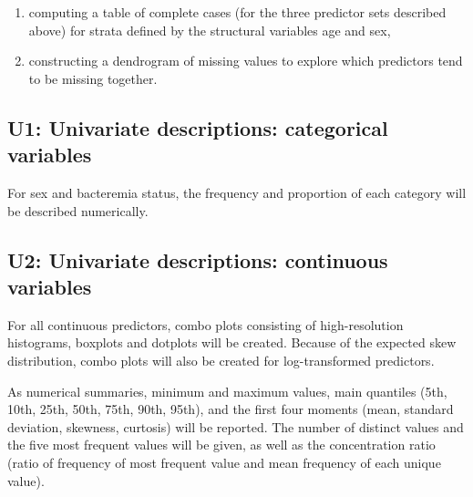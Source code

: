 \documentclass[
  letterpaper,
  DIV=11,
  numbers=noendperiod]{scrreport}
\providecommand{\tightlist}{%
  \setlength{\itemsep}{0pt}\setlength{\parskip}{0pt}}\usepackage{longtable,booktabs,array}
\begin{document}
\begin{enumerate}
\def\labelenumi{\arabic{enumi}.}
\tightlist
\item
  computing a table of complete cases (for the three predictor sets
  described above) for strata defined by the structural variables age
  and sex,
\item
  constructing a dendrogram of missing values to explore which
  predictors tend to be missing together.
\end{enumerate}

\hypertarget{u1-univariate-descriptions-categorical-variables}{%
\subsection{U1: Univariate descriptions: categorical
variables}\label{u1-univariate-descriptions-categorical-variables}}

For sex and bacteremia status, the frequency and proportion of each
category will be described numerically.

\hypertarget{u2-univariate-descriptions-continuous-variables}{%
\subsection{U2: Univariate descriptions: continuous
variables}\label{u2-univariate-descriptions-continuous-variables}}

For all continuous predictors, combo plots consisting of high-resolution
histograms, boxplots and dotplots will be created. Because of the
expected skew distribution, combo plots will also be created for
log-transformed predictors.

As numerical summaries, minimum and maximum values, main quantiles (5th,
10th, 25th, 50th, 75th, 90th, 95th), and the first four moments (mean,
standard deviation, skewness, curtosis) will be reported. The number of
distinct values and the five most frequent values will be given, as well
as the concentration ratio (ratio of frequency of most frequent value
and mean frequency of each unique value).
\end{document}
